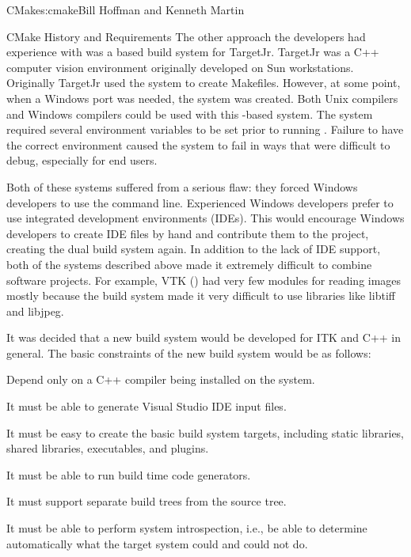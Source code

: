\begin{aosachapter}{CMake}{s:cmake}{Bill Hoffman and Kenneth Martin}
\begin{aosasect1}{CMake History and Requirements}
The other approach the developers had experience with was a
 based build system for TargetJr.  TargetJr was a C++
computer vision environment originally developed on Sun
workstations. Originally TargetJr used the  system to
create Makefiles. However, at some point, when a Windows port was
needed, the  system was created. Both Unix compilers and
Windows compilers could be used with this -based system.
The system required several environment variables to be set prior to
running .  Failure to have the correct environment caused
the system to fail in ways that were difficult to debug, especially
for end users.

Both of these systems suffered from a serious flaw: they forced
Windows developers to use the command line. Experienced Windows
developers prefer to use integrated development environments (IDEs).
This would encourage Windows developers to create IDE files by hand
and contribute them to the project, creating the dual build system
again.  In addition to the lack of IDE support, both of the systems
described above made it extremely difficult to combine software
projects. For example, VTK () had very few modules for reading images
mostly because the build system made it very difficult to use
libraries like libtiff and libjpeg.

It was decided that a new build system would be developed for ITK and
C++ in general. The basic constraints of the new build system would be
as follows:

\begin{aosaitemize}

  \item Depend only on a C++ compiler being installed on the system.

  \item It must be able to generate Visual Studio IDE input files.

  \item It must be easy to create the basic build system targets,
    including static libraries, shared libraries, executables, and
    plugins.

  \item It must be able to run build time code generators.

  \item It must support separate build trees from the source tree.

  \item It must be able to perform system introspection, i.e.,
    be able to determine automatically what the target system
    could and could not do.


\end{aosaitemize}
\end{aosasect1}
\end{aosachapter}
